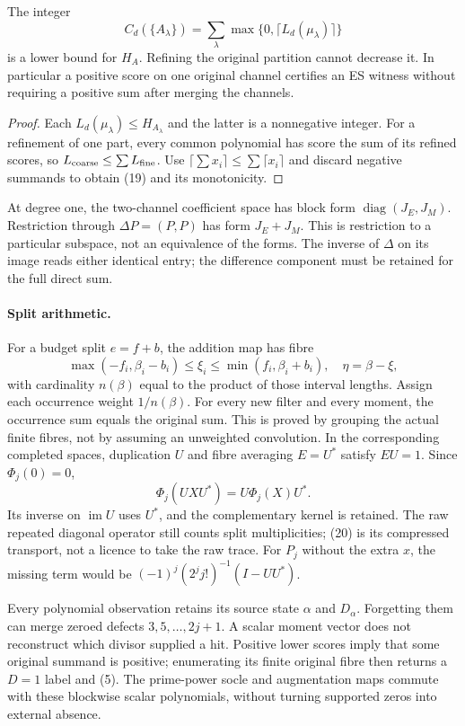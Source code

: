 \begin{proposition}
The integer
\[
 C_d(\{A_\lambda\})=
 \sum_\lambda\max\{0,\lceil L_d(\mu_\lambda)\rceil\}
 \tag{19}
\]
is a lower bound for $H_A$. Refining the original partition cannot decrease it.
In particular a positive score on one original channel certifies an ES witness
without requiring a positive sum after merging the channels.
\end{proposition}
\begin{proof}
Each $L_d(\mu_\lambda)\le H_{A_\lambda}$ and the latter is a nonnegative
integer. For a refinement of one part, every common polynomial has score the
sum of its refined scores, so $L_{\rm coarse}\le\sum L_{\rm fine}$.
Use $\lceil\sum x_i\rceil\le\sum\lceil x_i\rceil$ and discard negative
summands to obtain (19) and its monotonicity.
\end{proof}

At degree one, the two-channel coefficient space has block form
$\operatorname{diag}(J_E,J_M)$. Restriction through
$\Delta P=(P,P)$ has form $J_E+J_M$. This is restriction to a particular
subspace, not an equivalence of the forms. The inverse of $\Delta$ on its
image reads either identical entry; the difference component must be retained
for the full direct sum.

\paragraph{Split arithmetic.}
For a budget split $e=f+b$, the addition map has fibre
\[
 \max(-f_i,\beta_i-b_i)\le\xi_i\le\min(f_i,\beta_i+b_i),\quad\eta=\beta-\xi,
\]
with cardinality $n(\beta)$ equal to the product of those interval lengths.
Assign each occurrence weight $1/n(\beta)$. For every new filter and every
moment, the occurrence sum equals the original sum. This is proved by grouping
the actual finite fibres, not by assuming an unweighted convolution.
In the corresponding completed spaces, duplication $U$ and fibre averaging
$E=U^*$ satisfy $EU=1$. Since $\Phi_j(0)=0$,
\[
 \boxed{\Phi_j(UXU^*)=U\Phi_j(X)U^*.}\tag{20}
\]
Its inverse on $\operatorname{im}U$ uses $U^*$, and the complementary kernel
is retained. The raw repeated diagonal operator still counts split
multiplicities; (20) is its compressed transport, not a licence to take the raw
trace. For $P_j$ without the extra $x$, the missing term would be
$(-1)^j(2^j j!)^{-1}(I-UU^*)$.

Every polynomial observation retains its source state $\alpha$ and $D_\alpha$.
Forgetting them can merge zeroed defects $3,5,\ldots,2j+1$. A scalar moment
vector does not reconstruct which divisor supplied a hit. Positive lower
scores imply that some original summand is positive; enumerating its finite
original fibre then returns a $D=1$ label and (5). The prime-power socle and
augmentation maps commute with these blockwise scalar polynomials, without
turning supported zeros into external absence.

